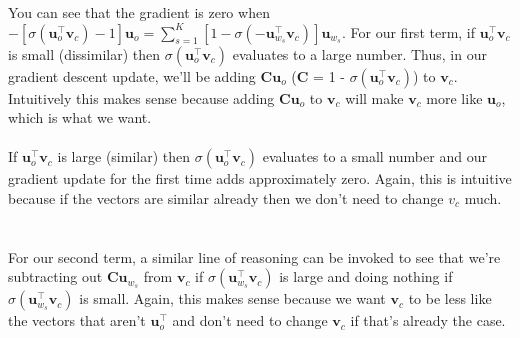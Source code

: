 \documentclass[12pt]{article}
\begin{document}
You can see that the gradient is zero when 
$-[\sigma(\bm u_o^\top \bm v_c) - 1] \bm u_o = \sum_{s=1}^K [1 - \sigma(-\bm u_{w_s}^\top \bm v_c)] \bm u_{w_s}$. 
For our first term, if $\bm u_o^\top \bm v_c$ is small (dissimilar) then $\sigma (\bm u_o^\top \bm v_c)$ evaluates to a large number.
Thus, in our gradient descent update, we'll be adding $\bm C \bm u_o$ ($\bm C$ = 1 - $\sigma (\bm u_o^\top \bm v_c)$) to 
$\bm v_c$. Intuitively this makes sense because adding $\bm C \bm u_o$ to $\bm v_c$ will make $\bm v_c$ 
more like $\bm u_o$, which is what we want.
~\\
~\\
If $\bm u_o^\top \bm v_c$ is large (similar) then $\sigma (\bm u_o^\top \bm v_c)$ evaluates to a small number 
and our gradient update for the first time adds approximately zero. Again, this is intuitive because if the 
vectors are similar already then we don't need to change $v_c$ much. 
~\\
~\\
For our second term, a similar line of reasoning can be invoked to see that we're subtracting out 
$\bm C \bm u_{w_s}$ from $\bm v_c$ if $\sigma (\bm u_{w_s}^\top \bm v_c)$ is large and doing nothing 
if $\sigma (\bm u_{w_s}^\top \bm v_c)$ is small. Again, this makes sense because we want $\bm v_c$ to be less 
like the vectors that aren't $\bm u_o^\top$ and don't need to change $\bm v_c$ if that's already the case. 
\end{document}
